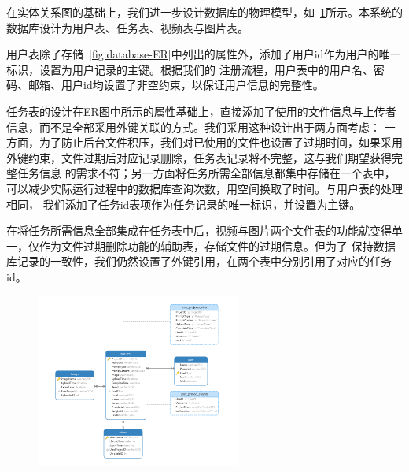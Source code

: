 在实体关系图的基础上，我们进一步设计数据库的物理模型，如~\ref{fig:database-design}所示。本系统的数据库设计为用户表、任务表、视频表与图片表。

用户表除了存储~\ref{fig:database-ER}中列出的属性外，添加了用户id作为用户的唯一标识，设置为用户记录的主键。根据我们的
注册流程，用户表中的用户名、密码、邮箱、用户id均设置了非空约束，以保证用户信息的完整性。

任务表的设计在ER图中所示的属性基础上，直接添加了使用的文件信息与上传者信息，而不是全部采用外键关联的方式。我们采用这种设计出于两方面考虑：
一方面，为了防止后台文件积压，我们对已使用的文件也设置了过期时间，如果采用外键约束，文件过期后对应记录删除，任务表记录将不完整，这与我们期望获得完整任务信息
的需求不符；另一方面将任务所需全部信息都集中存储在一个表中，可以减少实际运行过程中的数据库查询次数，用空间换取了时间。与用户表的处理相同，
我们添加了任务id表项作为任务记录的唯一标识，并设置为主键。

在将任务所需信息全部集成在任务表中后，视频与图片两个文件表的功能就变得单一，仅作为文件过期删除功能的辅助表，存储文件的过期信息。但为了
保持数据库记录的一致性，我们仍然设置了外键引用，在两个表中分别引用了对应的任务id。

\begin{figure}[ht]
    \centering
    \includegraphics[width=0.6\textwidth]{source/img/database_design.png}
    \label{fig:database-design}
\end{figure}
